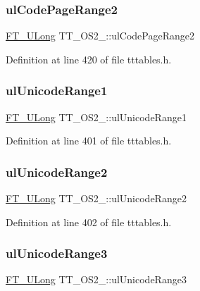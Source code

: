 \subsubsection{\texorpdfstring{ulCodePageRange2}{ulCodePageRange2}}
{\footnotesize\ttfamily \mbox{\hyperlink{fttypes_8h_a4fac88bdba78eb76b505efa6e4fbf3f5}{F\+T\+\_\+\+U\+Long}} T\+T\+\_\+\+O\+S2\+\_\+\+::ul\+Code\+Page\+Range2}



Definition at line 420 of file tttables.\+h.

\mbox{\label{struct_t_t___o_s2___a055cc7568ba3ee86490480d010badda1}} 
\subsubsection{\texorpdfstring{ulUnicodeRange1}{ulUnicodeRange1}}
{\footnotesize\ttfamily \mbox{\hyperlink{fttypes_8h_a4fac88bdba78eb76b505efa6e4fbf3f5}{F\+T\+\_\+\+U\+Long}} T\+T\+\_\+\+O\+S2\+\_\+\+::ul\+Unicode\+Range1}



Definition at line 401 of file tttables.\+h.

\mbox{\label{struct_t_t___o_s2___a9eba0e6ec6c4a3a36a39289628b48afa}} 
\subsubsection{\texorpdfstring{ulUnicodeRange2}{ulUnicodeRange2}}
{\footnotesize\ttfamily \mbox{\hyperlink{fttypes_8h_a4fac88bdba78eb76b505efa6e4fbf3f5}{F\+T\+\_\+\+U\+Long}} T\+T\+\_\+\+O\+S2\+\_\+\+::ul\+Unicode\+Range2}



Definition at line 402 of file tttables.\+h.

\mbox{\label{struct_t_t___o_s2___a51b2598a92d1ea6f9bc92281323a564c}} 
\subsubsection{\texorpdfstring{ulUnicodeRange3}{ulUnicodeRange3}}
{\footnotesize\ttfamily \mbox{\hyperlink{fttypes_8h_a4fac88bdba78eb76b505efa6e4fbf3f5}{F\+T\+\_\+\+U\+Long}} T\+T\+\_\+\+O\+S2\+\_\+\+::ul\+Unicode\+Range3}



